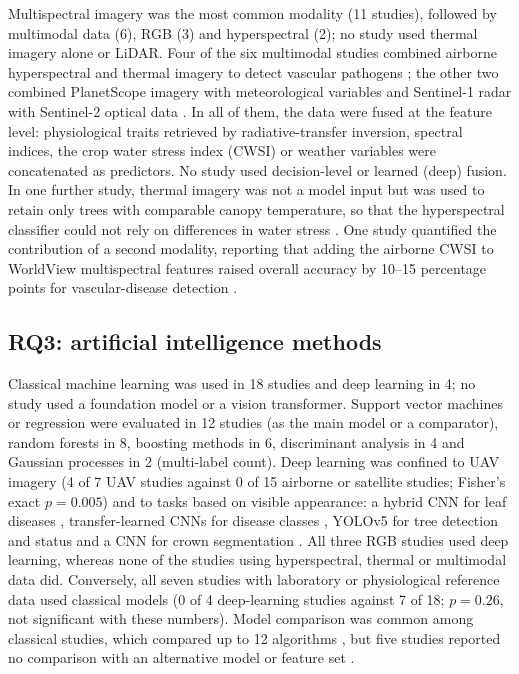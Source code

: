 \documentclass[preprint,12pt]{elsarticle}
\begin{document}
Multispectral imagery was the most common modality (11 studies), followed by multimodal data (6), RGB (3) and hyperspectral (2); no study used thermal imagery alone or LiDAR. Four of the six multimodal studies combined airborne hyperspectral and thermal imagery to detect vascular pathogens \citep{u002,u008,u030,u113}; the other two combined PlanetScope imagery with meteorological variables \citep{u133} and Sentinel-1 radar with Sentinel-2 optical data \citep{u135}. In all of them, the data were fused at the feature level: physiological traits retrieved by radiative-transfer inversion, spectral indices, the crop water stress index (CWSI) or weather variables were concatenated as predictors. No study used decision-level or learned (deep) fusion. In one further study, thermal imagery was not a model input but was used to retain only trees with comparable canopy temperature, so that the hyperspectral classifier could not rely on differences in water stress \citep{u121}. One study quantified the contribution of a second modality, reporting that adding the airborne CWSI to WorldView multispectral features raised overall accuracy by 10--15 percentage points for vascular-disease detection \citep{u056}.
 
\subsection{RQ3: artificial intelligence methods}\label{sec:methods_ai}
Classical machine learning was used in 18 studies and deep learning in 4; no study used a foundation model or a vision transformer. Support vector machines or regression were evaluated in 12 studies (as the main model or a comparator), random forests in 8, boosting methods in 6, discriminant analysis in 4 and Gaussian processes in 2 (multi-label count). Deep learning was confined to UAV imagery (4 of 7 UAV studies against 0 of 15 airborne or satellite studies; Fisher's exact $p=0.005$) and to tasks based on visible appearance: a hybrid CNN for leaf diseases \citep{u046}, transfer-learned CNNs for disease classes \citep{u080}, YOLOv5 for tree detection and status \citep{u055} and a CNN for crown segmentation \citep{u021}. All three RGB studies used deep learning, whereas none of the studies using hyperspectral, thermal or multimodal data did. Conversely, all seven studies with laboratory or physiological reference data used classical models (0 of 4 deep-learning studies against 7 of 18; $p=0.26$, not significant with these numbers). Model comparison was common among classical studies, which compared up to 12 algorithms \citep{u045}, but five studies reported no comparison with an alternative model or feature set \citep{u013,u036,u113,u108,kallel2022olive}.
 
\end{document}
